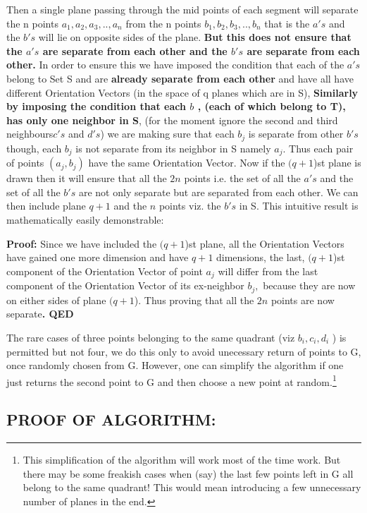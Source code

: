 \documentclass[english]{article}
\begin{document}
Then a single plane passing through the mid points of each segment
will separate the n points $a_{1},a_{2},a_{3},..,a_{n}$ from the
n points $b_{1},b_{2},b{}_{3},..,b{}_{n}$ that is the $a's$ and
the $b's$ will lie on opposite sides of the plane. \textbf{But this
does not ensure that the $a's$ are separate from each other and the
$b's$ are separate from each other.} In order to ensure this we have
imposed the condition that each of the $a's$ belong to Set S and
are \textbf{already separate from each other }and have all have different
Orientation Vectors (in the space of q planes which are in S), \textbf{Similarly
by imposing the condition that each $b$ , (each of which belong to
T), has only one neighbor in S}, (for the moment ignore the second
and third neighbours$c's$ and $d's$) we are making sure that each
$b_{j}$ is separate from other $b's$ though, each $b_{j}$ is not
separate from its neighbor in S namely $a_{j}$. Thus each pair of
points $(a_{j},b_{j})$ have the same Orientation Vector. Now if the
$(q+1$)st plane is drawn then it will ensure that all the $2n$ points
i.e. the set of all the $a's$ and the set of all the $b's$ are not
only separate but are separated from each other. We can then include
plane $q+1$ and the $n$ points viz. the $b's$ in S. This intuitive
result is mathematically easily demonstrable:\textbf{ }

\textbf{Proof:} Since we have included the $(q+1$)st plane, all the
Orientation Vectors have gained one more dimension and have $q+1$
dimensions, the last, $(q+1$)st component of the Orientation Vector
of point $a_{j}$ will differ from the last component of the Orientation
Vector of its ex-neighbor $b_{j},$ because they are now on either
sides of plane $(q+1$). Thus proving that all the $2n$ points are
now separate\textbf{. QED}

The rare cases of three points belonging to the same quadrant (viz
$b_{i},c_{i},d_{i}$ ) is permitted but not four, we do this only
to avoid unecessary return of points to G, once randomly chosen from
G. However, one can simplify the algorithm if one just returns the
second point to G and then choose a new point at random.\footnote{This simplification of the algorithm will work most of the time work.
But there may be some freakish cases when (say) the last few points
left in G all belong to the same quadrant! This would mean introducing
a few unnecessary number of planes in the end.}


\subsection{PROOF OF ALGORITHM:}
\end{document}
